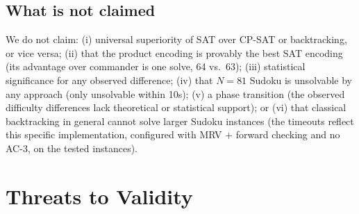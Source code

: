 \documentclass[a4paper,fleqn]{cas-sc}
\begin{document}
\subsection{What is not claimed}

We do not claim: (i) universal superiority of SAT over CP-SAT or backtracking, or vice versa; (ii) that the product encoding is provably the best SAT encoding (its advantage over commander is one solve, 64 vs.\ 63); (iii) statistical significance for any observed difference; (iv) that \(N=81\) Sudoku is unsolvable by any approach (only unsolvable within 10s); (v) a phase transition (the observed difficulty differences lack theoretical or statistical support); or (vi) that classical backtracking in general cannot solve larger Sudoku instances (the timeouts reflect this specific implementation, configured with MRV + forward checking and no AC-3, on the tested instances).


\section{Threats to Validity}\label{sec:threats}
\end{document}
